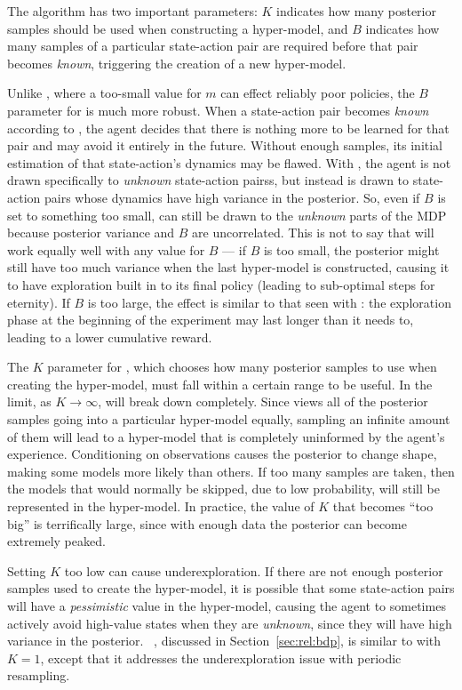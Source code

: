 The  algorithm has two important parameters: $K$ indicates how many posterior samples should be used when constructing a hyper-model, and $B$ indicates how many samples of a particular state-action pair are required before that pair becomes \emph{known}, triggering the creation of a new hyper-model.

Unlike , where a too-small value for $m$ can effect reliably poor policies, the $B$ parameter for  is much more robust. When a state-action pair becomes \emph{known} according to , the agent decides that there is nothing more to be learned for that pair and may avoid it entirely in the future. Without enough samples, its initial estimation of that state-action's dynamics may be flawed. With , the agent is not drawn specifically to \emph{unknown} state-action pairss, but instead is drawn to state-action pairs whose dynamics have high variance in the posterior. So, even if $B$ is set to something too small,  can still be drawn to the \emph{unknown} parts of the MDP because posterior variance and $B$ are uncorrelated. This is not to say that  will work equally well with any value for $B$ --- if $B$ is too small, the posterior might still have too much variance when the last hyper-model is constructed, causing it to have exploration built in to its final policy (leading to sub-optimal steps for eternity). If $B$ is too large, the effect is similar to that seen with : the exploration phase at the beginning of the experiment may last longer than it needs to, leading to a lower cumulative reward.

The $K$ parameter for , which chooses how many posterior samples to use when creating the hyper-model, must fall within a certain range to be useful. In the limit, as $K\rightarrow\infty$,  will break down completely. Since  views all of the posterior samples going into a particular hyper-model equally, sampling an infinite amount of them will lead to a hyper-model that is completely uninformed by the agent's experience. Conditioning on observations causes the posterior to change shape, making some models more likely than others. If too many samples are taken, then the models that would normally be skipped, due to low probability, will still be represented in the hyper-model. In practice, the value of $K$ that becomes ``too big'' is terrifically large, since with enough data the posterior can become extremely peaked.

Setting $K$ too low can cause underexploration. If there are not enough posterior samples used to create the hyper-model, it is possible that some state-action pairs will have a \emph{pessimistic} value in the hyper-model, causing the agent to sometimes actively avoid high-value states when they are \emph{unknown}, since they will have high variance in the posterior. ~\cite{strens00}, discussed in Section~\ref{sec:rel:bdp}, is similar to  with $K=1$, except that it addresses the underexploration issue with periodic resampling.

